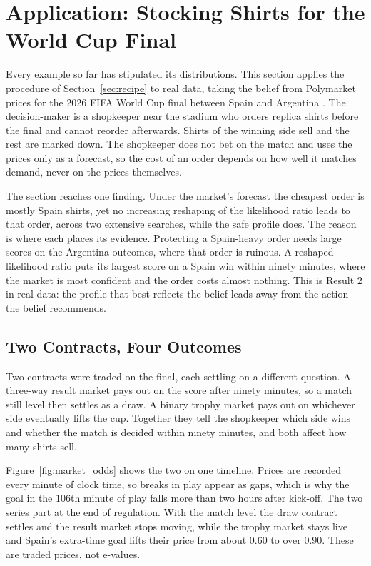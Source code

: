 \section{Application: Stocking Shirts for the World Cup Final}\label{sec:market}

Every example so far has stipulated its distributions. This section applies
the procedure of Section~\ref{sec:recipe} to real data, taking the belief from
Polymarket prices for the 2026 FIFA World Cup final between Spain and
Argentina \citep{Marketlens2026}. The decision-maker is a shopkeeper near the
stadium who orders replica shirts before the final and cannot reorder
afterwards. Shirts of the winning side sell and the rest are marked down. The
shopkeeper does not bet on the match and uses the prices only as a forecast,
so the cost of an order depends on how well it matches demand, never on the
prices themselves.

The section reaches one finding. Under the market's forecast the cheapest
order is mostly Spain shirts, yet no increasing reshaping of the likelihood
ratio leads to that order, across two extensive searches, while the safe
profile does. The reason is where each places its evidence. Protecting a
Spain-heavy order needs large scores on the Argentina outcomes, where that
order is ruinous. A reshaped likelihood ratio puts its largest score on a
Spain win within ninety minutes, where the market is most confident and the order
costs almost nothing. This is Result 2 in real data: the profile that best
reflects the belief leads away from the action the belief recommends.

\subsection{Two Contracts, Four Outcomes}\label{sec:mkt_data}

Two contracts were traded on the final, each settling on a different
question. A three-way result market pays out on the score after ninety
minutes, so a match still level then settles as a draw. A binary trophy
market pays out on whichever side eventually lifts the cup. Together they
tell the shopkeeper which side wins and whether the match is decided within
ninety minutes, and both affect how many shirts sell.

Figure~\ref{fig:market_odds} shows the two on one timeline. Prices are
recorded every minute of clock time, so breaks in play appear as gaps, which
is why the goal in the $106$th minute of play falls more than two hours after
kick-off. The two series part at the end of regulation. With the match level
the draw contract settles and the result market stops moving, while the
trophy market stays live and Spain's extra-time goal lifts their price from
about $0.60$ to over $0.90$. These are traded prices, not e-values.

